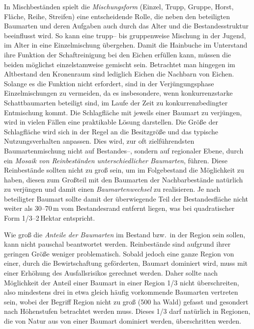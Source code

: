 \documentclass[twocolumn]{scrartcl}
\begin{document}
In Mischbeständen spielt die \emph{Mischungsform} (Einzel, Trupp,
Gruppe, Horst, Fläche, Reihe, Streifen) eine entscheidende Rolle, die
neben den beteiligten Baumarten und deren Aufgaben auch durch das
Alter und die Bestandesstruktur beeinflusst wird. So kann eine trupp--
bis gruppenweise Mischung in der Jugend, im Alter in eine
Einzelmischung übergehen. Damit die Hainbuche im Unterstand ihre
Funktion der Schaftreinigung bei den Eichen erfüllen kann, müssen
die beiden möglichst einzelstamweise gemischt sein. Betrachtet man
hingegen im Altbestand den Kronenraum sind lediglich Eichen die
Nachbarn von Eichen. Solange es die Funktion nicht erfordert, sind in
der Verjüngungsphase Einzelmischungen zu vermeiden, da es insbesondere, wenn konkurrenzstarke Schattbaumarten beteiligt sind, im Laufe der Zeit
zu konkurrenzbedingter Entmischung kommt. Die Schlagfläche mit jeweils
einer Baumart zu verjüngen, wird in vielen Fällen eine praktikable
Lösung darstellen. Die Größe der Schlagfläche wird sich in der Regel
an die Besitzgröße und das typische Nutzungsverhalten anpassen. Dies
wird, zur oft zielführendsten Baumartenmischung nicht auf Bestandes--,
sondern auf regionaler Ebene, durch ein \emph{Mosaik von Reinbeständen
unterschiedlicher Baumarten}, führen. Diese Reinbestände sollten
nicht zu groß sein, um im Folgebestand die Möglichkeit zu haben,
diesen zum Großteil mit den Baumarten der Nachbarbestände natürlich zu
verjüngen und damit einen \emph{Baumartenwechsel} zu realisieren. Je
nach beteiligter Baumart sollte damit der überwiegende Teil der
Bestandesfläche nicht weiter als 30--70\,m vom Bestandesrand entfernt
liegen, was bei quadratischer Form 1/3--2\,Hektar entspricht.

Wie groß die \emph{Anteile der Baumarten} im Bestand bzw.\ in der
Region sein sollen, kann nicht pauschal beantwortet
werden. Reinbestände sind aufgrund ihrer geringen Größe weniger
problematisch. Sobald jedoch eine ganze Region von einer, durch die
Bewirtschaftung geförderten, Baumart dominiert wird, muss mit einer
Erhöhung des Ausfallsrisikos gerechnet werden. Daher sollte nach
Möglichkeit der Anteil einer Baumart in einer Region 1/3 nicht
überschreiten, also mindestens drei in etwa gleich häufig vorkommende
Baumarten vertreten sein, wobei der Begriff Region nicht zu groß (500
ha Wald) gefasst und gesondert nach Höhenstufen betrachtet werden
muss. Dieses 1/3 darf natürlich in Regionen, die von Natur aus von
einer Baumart dominiert werden, überschritten werden.
\end{document}
